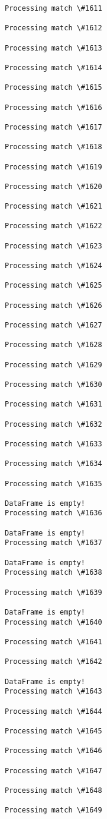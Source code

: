 \documentclass[11pt]{article}
\begin{document}
\begin{Verbatim}[commandchars=\\\{\}]
Processing match \#1611

Processing match \#1612

Processing match \#1613

Processing match \#1614

Processing match \#1615

Processing match \#1616

Processing match \#1617

Processing match \#1618

Processing match \#1619

Processing match \#1620

Processing match \#1621

Processing match \#1622

Processing match \#1623

Processing match \#1624

Processing match \#1625

Processing match \#1626

Processing match \#1627

Processing match \#1628

Processing match \#1629

Processing match \#1630

Processing match \#1631

Processing match \#1632

Processing match \#1633

Processing match \#1634

Processing match \#1635

DataFrame is empty!
Processing match \#1636

DataFrame is empty!
Processing match \#1637

DataFrame is empty!
Processing match \#1638

Processing match \#1639

DataFrame is empty!
Processing match \#1640

Processing match \#1641

Processing match \#1642

DataFrame is empty!
Processing match \#1643

Processing match \#1644

Processing match \#1645

Processing match \#1646

Processing match \#1647

Processing match \#1648

Processing match \#1649


\end{Verbatim}
\end{document}
